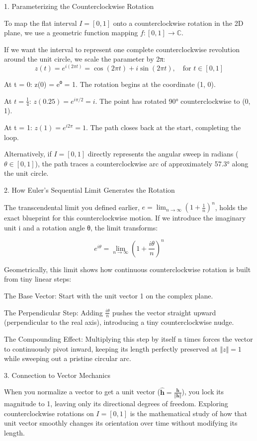 1. Parameterizing the Counterclockwise Rotation

To map the flat interval $I=[0,1]$ onto a counterclockwise rotation in the 2D plane, we use a geometric function mapping $f: [0, 1] \to \mathbb{C}$.

If we want the interval to represent one complete counterclockwise revolution around the unit circle, we scale the parameter by 2π:
$$z(t) = e^{i (2\pi t)} = \cos(2\pi t) + i\sin(2\pi t), \quad \text{for } t \in [0,1]$$ 

At t = 0: z(0) = e⁰ = 1. The rotation begins at the coordinate (1, 0).

At $t = \frac{1}{4}$: $z(0.25) = e^{i\pi/2} = i$. The point has rotated 90° counterclockwise to (0, 1).

At t = 1: $z(1) = e^{i2\pi} = 1$. The path closes back at the start, completing the loop.

Alternatively, if $I=[0,1]$ directly represents the angular sweep in radians ($\theta \in [0, 1]$), the path traces a counterclockwise arc of approximately 57.3° along the unit circle.

2. How Euler’s Sequential Limit Generates the Rotation

The transcendental limit you defined earlier, $e = \lim_{n\to\infty}(1+\frac{1}{n})^n$, holds the exact blueprint for this counterclockwise motion. If we introduce the imaginary unit i and a rotation angle θ, the limit transforms:

$$e^{i\theta} = \lim_{n\to\infty} \left(1 + \frac{i\theta}{n}\right)^n$$ 

Geometrically, this limit shows how continuous counterclockwise rotation is built from tiny linear steps:

The Base Vector: Start with the unit vector 1 on the complex plane.

The Perpendicular Step: Adding $\frac{i\theta}{n}$ pushes the vector straight upward (perpendicular to the real axis), introducing a tiny counterclockwise nudge.

The Compounding Effect: Multiplying this step by itself n times forces the vector to continuously pivot inward, keeping its length perfectly preserved at $\Vert z \Vert = 1$ while sweeping out a pristine circular arc.

3. Connection to Vector Mechanics

When you normalize a vector to get a unit vector ($\hat{\mathbf{h}} = \frac{\mathbf{h}}{\Vert{}\mathbf{h}\Vert{}}$), you lock its magnitude to 1, leaving only its directional degrees of freedom. Exploring counterclockwise rotations on $I=[0,1]$ is the mathematical study of how that unit vector smoothly changes its orientation over time without modifying its length.

